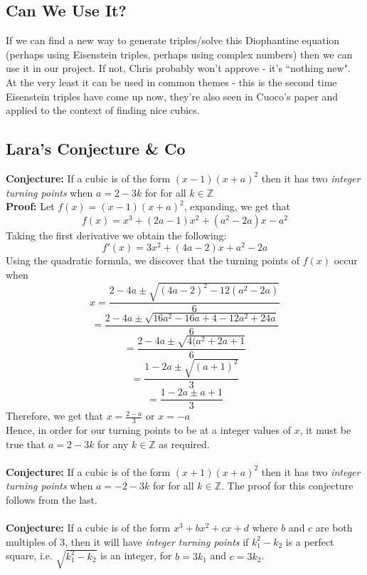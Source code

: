 \documentclass[12pt]{article}
\begin{document}
\subsection{Can We Use It?}
If we can find a new way to generate triples/solve this Diophantine equation (perhaps using Eisenstein triples, perhaps using complex numbers) then we can use it in our project. If not, Chris probably won't approve - it's ``nothing new". At the very least it can be used in common themes - this is the second time Eisenstein triples have come up now, they're also seen in Cuoco's paper \autocite{cuoco2000} and applied to the context of finding nice cubics.

\subsection{Lara's Conjecture \& Co}
\textbf{Conjecture:} If a cubic is of the form $(x-1)(x+a)^2$ then it has two \textit{integer turning points} when $a = 2-3k$ for for all $k \in \mathbb{Z}$\\

\textbf{Proof:} Let $f(x)=(x-1)(x+a)^2$, expanding, we get that $$f(x)=x^3+(2a-1)x^2+(a^2-2a)x-a^2$$ 
Taking the first derivative we obtain the following:
$$f'(x)=3x^2+(4a-2)x+a^2-2a$$
Using the quadratic formula, we discover that the turning points of $f(x)$ occur when $$x=\frac{2 - 4a \pm \sqrt{(4a - 2)^2 - 12(a^2 - 2a)}}{6}$$
$$=\frac{2 - 4a \pm \sqrt{16a^2-16a+4-12a^2+24a}}{6}$$
$$=\frac{2 - 4a \pm \sqrt{4(a^2+2a+1}}{6}$$
$$=\frac{1 - 2a \pm \sqrt{(a+1)^2}}{3}$$
$$=\frac{1 - 2a \pm a+1}{3}$$
Therefore, we get that 
$x=\frac{2 - a}{3}$ or $x=-a$\\
Hence, in order for our turning points to be at a integer values of $x$, it must be true that $a=2-3k$ for any $k \in \mathbb{Z}$ as required.\\\\

\textbf{Conjecture:} If a cubic is of the form $(x+1)(x+a)^2$ then it has two \textit{integer turning points} when $a = -2-3k$ for for all $k \in \mathbb{Z}$. The proof for this conjecture follows from the last.\\\\


\textbf{Conjecture:} If a cubic is of the form $x^3 + bx^2 + cx + d$ where $b$ and $c$ are both multiples of $3$, then it will have \textit{integer turning points} if $k_1^2 - k_2$ is a perfect square, i.e. $\sqrt{k_1^2 - k_2}$ is an integer, for $b = 3k_1$ and $c = 3k_2$. \\
\end{document}
